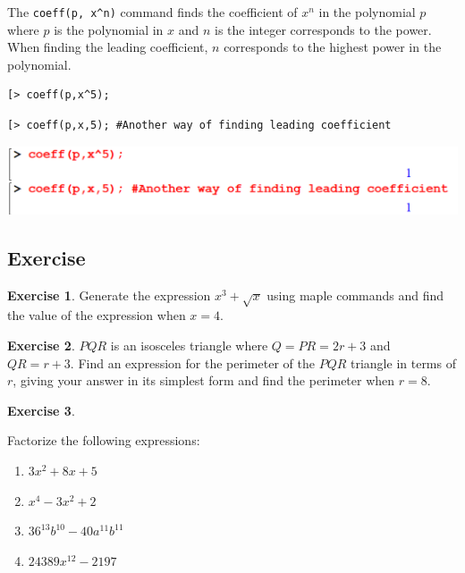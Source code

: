 \documentclass[
]{book}
\providecommand{\tightlist}{%
  \setlength{\itemsep}{0pt}\setlength{\parskip}{0pt}}
\theoremstyle{definition}
\theoremstyle{definition}
\theoremstyle{definition}
\newtheorem{exercise}{Exercise}[chapter]
\theoremstyle{definition}
\theoremstyle{remark}
\begin{document}
The \texttt{coeff(p,\ x\^{}n)} command finds the coefficient of \(x^n\) in the polynomial \(p\) where \(p\) is the
polynomial in \(x\) and \(n\) is the integer corresponds to the power. When finding the leading coefficient, \(n\) corresponds to the highest power in the polynomial.

\begin{verbatim}
[> coeff(p,x^5);
\end{verbatim}

\begin{verbatim}
[> coeff(p,x,5); #Another way of finding leading coefficient
\end{verbatim}

\includegraphics{figures/Lesson 1/fig55.png}

\subsection{Exercise}\label{exercise-3}

\begin{exercise}
\protect\hypertarget{exr:unnamed-chunk-14}{}\label{exr:unnamed-chunk-14}Generate the expression \(x^3 + \sqrt{x}\) using maple commands and find the value of the expression when \(x = 4\).
\end{exercise}

\begin{exercise}
\protect\hypertarget{exr:unnamed-chunk-15}{}\label{exr:unnamed-chunk-15}\(PQR\) is an isosceles triangle where \(𝑄 = 𝑃𝑅 = 2𝑟 + 3\) and \(𝑄𝑅 = 𝑟 + 3\). Find an expression for the perimeter of the \(𝑃𝑄𝑅\) triangle in terms of \(𝑟\), giving your answer in its simplest form and find the perimeter when \(𝑟 = 8\).
\end{exercise}

\begin{exercise}
\protect\hypertarget{exr:unnamed-chunk-16}{}\label{exr:unnamed-chunk-16}

Factorize the following expressions:

\begin{enumerate}
\def\labelenumi{\roman{enumi}.}
\tightlist
\item
  \(3x^2 + 8x + 5\)
\item
  \(x^4 − 3x^2 + 2\)
\item
  \(36^{13}𝑏^{10} − 40𝑎^{11}𝑏^{11}\)
\item
  \(24389x^{12} − 2197\)
\end{enumerate}

\end{exercise}
\end{document}
